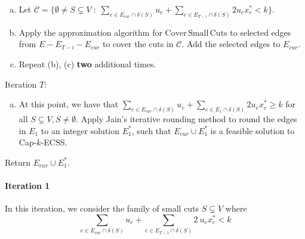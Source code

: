 \documentclass[11pt]{article}
\newcommand{\C}{\mathscr{C}}
\newcommand\ASC{\mathrm{Cover\,Small\,Cuts}}
\newcommand{\alphatwo}{2}
\begin{document}
{{\begin{algorithm}[H]
\begin{algorithmic}[1]
\begin{enumerate}[(a)]
\begin{enumerate}[(i)]
            \item Apply the approximation algorithm for $\ASC$ to select edges from $E _{T-i+1}- E_{T-i} - E_{cur}$ to cover the cuts in $\C$.  Add the selected edges to $E_{cur}$.
        \end{enumerate}

        \item Let $\C = \{\emptyset\neq S \subsetneq V \; : \; \sum_{e \in E_{cur} \cap \delta(S)}u_e + \sum_{e \in E_{T-i} \cap \delta(S)} 2 u_e x^*_e < k\}$.  
            
        \item Apply the approximation algorithm for $\ASC$ to selected edges from $E - E_{T-i} - E_{cur}$ to cover the cuts in $\C$.  Add the selected edges to $E_{cur}$.

        \item Repeat (b), (c) \textbf{two} additional times.
    \end{enumerate}

    \State Iteration $T$:
    \begin{enumerate}[(a)]
        \item At this point, we have that $\sum_{e \in E_{cur} \cap \delta(S)}u_e + \sum_{e \in E_1 \cap \delta(S)}2 u_e x^*_e \geq k$ for all $S \subsetneq V, S \neq \emptyset$.  Apply Jain's iterative rounding method to round the edges in $E_1$ to an integer solution $E_1^*$, such that $E_{cur} \cup E_1^*$ is a feasible solution to Cap-$k$-ECSS.
    \end{enumerate}

    \State Return $E_{cur} \cup E_1^*$.
    \end{algorithmic}
\end{algorithm}
}



\paragraph{Iteration 1}

In this iteration, we consider the family of small cuts $S \subsetneq V$ where
\[
\sum_{e\in E_{cur} \cap \delta(S)}u_e+ \sum_{e\in E_{T-1} \cap \delta(S)}\alphatwo\  u_ex^*_e < k \tag{definition of small cuts}
\]

}
\end{document}
